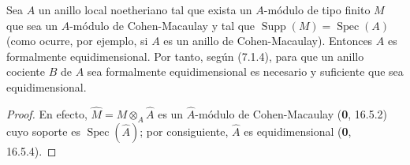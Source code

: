 \begin{corollary}[7.1.5]
\label{IV.2.s7.1.5-fr}
Sea $A$ un anillo local noetheriano tal que exista
un $A$-módulo de tipo finito $M$ que sea un
$A$-módulo de Cohen-Macaulay y tal que
$\operatorname{Supp}(M)=\operatorname{Spec}(A)$
\textup{(como ocurre, por ejemplo, si $A$ es un anillo de
Cohen-Macaulay)}. Entonces $A$ es formalmente
equidimensional. Por tanto, según \textup{(7.1.4)}, para
que un anillo cociente $B$ de $A$ sea formalmente
equidimensional es necesario y suficiente que sea
equidimensional.
\end{corollary}

\begin{proof}
En efecto, $\widehat M=M\otimes_A\widehat A$ es un
$\widehat A$-módulo de Cohen-Macaulay (\textbf 0, 16.5.2)
cuyo soporte es $\operatorname{Spec}(\widehat A)$;
por consiguiente, $\widehat A$ es equidimensional
(\textbf 0, 16.5.4).
\end{proof}

